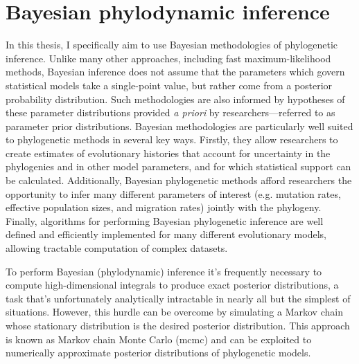 \section{Bayesian phylodynamic inference}

In this thesis, I specifically aim to use Bayesian methodologies of phylogenetic inference.
Unlike many other approaches, including fast maximum-likelihood methods, Bayesian inference does not assume that the parameters which govern statistical models take a single-point value, but rather come from a posterior probability distribution.
Such methodologies are also informed by hypotheses of these parameter distributions provided \textit{a priori} by researchers---referred to as parameter prior distributions.
Bayesian methodologies are particularly well suited to phylogenetic methods in several key ways.
Firstly, they allow researchers to create estimates of evolutionary histories that account for uncertainty in the phylogenies and in other model parameters, and for which statistical support can be calculated.
Additionally, Bayesian phylogenetic methods afford researchers the opportunity to infer many different parameters of interest (e.g. mutation rates, effective population sizes, and migration rates) jointly with the phylogeny.
Finally, algorithms for performing Bayesian phylogenetic inference are well defined and efficiently implemented for many different evolutionary models, allowing tractable computation of complex datasets.

To perform Bayesian (phylodynamic) inference it's frequently necessary to compute high-dimensional integrals to produce exact posterior distributions, a task that's unfortunately analytically intractable in nearly all but the simplest of situations.
However, this hurdle can be overcome by simulating a Markov chain whose stationary distribution is the desired posterior distribution.
This approach is known as Markov chain Monte Carlo (\gls{mcmc}) and can be exploited to numerically approximate posterior distributions of phylogenetic models.

